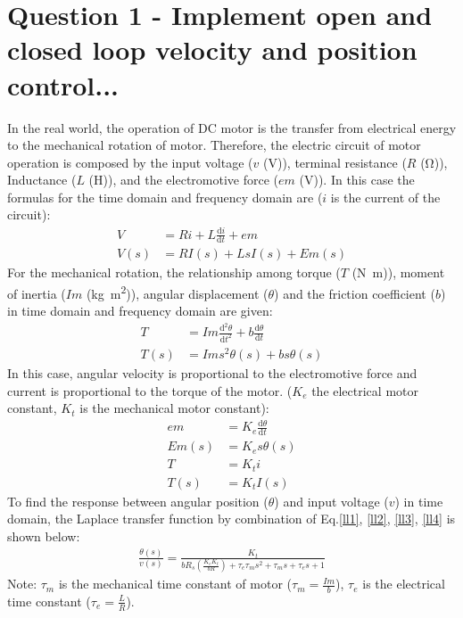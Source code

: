 \documentclass[conference]{IEEEtran}
\begin{document}
\section*{Question 1 - Implement open and closed loop velocity and position control...}
In the real world, the operation of DC motor is the transfer from electrical energy to the mechanical rotation of motor. Therefore, the electric circuit of motor operation is composed by the input voltage ($v$ (\si{\volt})), terminal resistance ($R$ (\si{\ohm})), Inductance ($L$ (\si{\henry})), and the electromotive force ($em$ (\si{\volt})). In this case the formulas for the time domain and frequency domain are ($i$ is the current of the circuit):
\begin{align}
    V &= Ri + L \frac{\textrm{d}i}{\textrm{d} t} + em\\
    V(s) &= RI(s) + LsI(s) + Em(s) \label{ll1}
\end{align}
For the mechanical rotation, the relationship among torque ($T$ (\si{\newton\metre})), moment of inertia ($Im$ (\si{\kg\metre\squared})), angular displacement ($\theta$) and the friction coefficient ($b$) in time domain and frequency domain are given:
\begin{align}
    T &= Im \frac{\textrm{d}^2 \theta}{\textrm{d} t^2} + b \frac{\textrm{d} \theta}{\textrm{d} t}\\
    T(s) &= Ims^2 \theta(s) + bs\theta(s)\label{ll2}
\end{align}
In this case, angular velocity is proportional to the electromotive force and current is proportional to the torque of the motor. ($K_e$ the electrical motor constant, $K_t$ is the mechanical motor constant):
\begin{align}
    em &= K_e \frac{\textrm{d} \theta}{\textrm{d} t}\\
    Em(s) &= K_e s \theta(s)\\ \label{ll3}
    T &= K_t i\\
    T(s) &= K_t I(s) \label{ll4}
\end{align}
To find the response between angular position ($\theta$) and input voltage ($v$) in time domain, the Laplace transfer function by combination of Eq.\ref{ll1}, \ref{ll2}, \ref{ll3}, \ref{ll4} is shown below:
\begin{align}
    \frac{\theta (s)}{v(s)} = \frac{K_t}{bR_s (\frac{K_e K_t}{bR}) + \tau_e \tau_m s^2 + \tau_m s + \tau_e s +1}
\end{align}
Note: $\tau_m$ is the mechanical time constant of motor ($\tau_m=\frac{Im}{b}$), $\tau_e$ is the electrical time constant ($\tau_e=\frac{L}{R}$).
\end{document}
